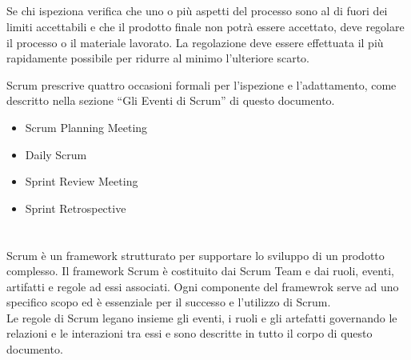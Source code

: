 \subsection*{\color{SteelBlue}{Adattamento}}
Se chi  ispeziona verifica che uno o pi\`u aspetti del processo sono al di fuori dei limiti accettabili  e che il prodotto finale non
potr\`a essere accettato, deve regolare il processo o il materiale lavorato.  La regolazione  deve essere  effettuata il  pi\`u rapidamente
possibile per ridurre al minimo l'ulteriore scarto.

Scrum prescrive quattro occasioni formali per l'ispezione e l'adattamento, come descritto nella sezione ``Gli Eventi di Scrum'' di questo 
documento.
\begin{itemize}
\item Scrum Planning Meeting
\item Daily Scrum
\item Sprint Review Meeting
\item Sprint Retrospective
\end{itemize}


\section*{\color{Blue}{Scrum}}
\label{sec:scrum}
Scrum \`e un framework strutturato per supportare lo sviluppo di un prodotto complesso. Il framework Scrum \`e costituito dai Scrum Team e 
dai ruoli, eventi, artifatti e regole ad essi associati. Ogni componente del framewrok serve ad uno specifico scopo ed \`e essenziale per il 
successo e l'utilizzo di Scrum.
\newline
\\ Le regole di Scrum legano insieme gli eventi, i ruoli e gli artefatti governando le relazioni e le interazioni tra essi e sono descritte 
in tutto il corpo di questo documento.